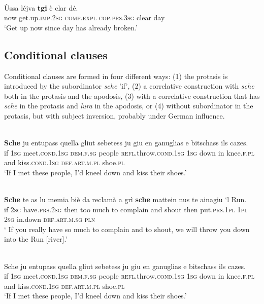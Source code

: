 \ea\label{}
\\
\gll Ùssa léjva \textbf{tgi} è clar dé.\\
  now get.up.\textsc{imp.2sg} \textsc{comp.expl} \textsc{cop.prs.3sg} clear day\\
\glt `Get up now since day has already broken.'
\z




\subsection{Conditional clauses}
Conditional clauses are formed in four different ways: (1) the protasis is introduced by the subordinator \textit{sche} 'if', (2) a correlative construction with \textit{sche} both in the protasis and the apodosis, (3) with a correlative construction that has \textit{sche} in the protasis and \textit{lura} in the apodosis, or (4) without subordinator in the protasis, but with subject inversion, probably under German influence.

\ea\label{}
\\
\gll \textbf{Sche} ju entupass quella gliut sebetess ju giu en ganuglias e bitschass ils cazes.\\
     if \textsc{1sg} meet.\textsc{cond.1sg} \textsc{dem.f.sg} people \textsc{refl}.throw.\textsc{cond.1sg} \textsc{1sg} down in knee.\textsc{f.pl} and kiss.\textsc{cond.1sg} \textsc{def.art.m.pl} shoe.\textsc{pl}\\
\glt `If I met these people, I’d kneel down and kiss their shoes.'
\z

\ea\label{}
\\
\gll \textbf{Sche} te as lu memia biè da reclamà a grì \textbf{sche} mattein nus te ainagiu ‘l Run.\\
if \textsc{2sg} have.\textsc{prs.2sg} then too much to complain and shout then put.\textsc{prs.1pl} \textsc{1pl} \textsc{2sg} in.down \textsc{def.art.m.sg} \textsc{pln}\\
     \glt ` If you really have so much to complain and to shout, we will throw you down into the Run [river].'
\z

\ea\label{}
\\
\gll Sche ju entupass quella gliut sebetess ju giu en ganuglias e bitschass ils cazes.\\
     if \textsc{1sg} meet.\textsc{cond.1sg} \textsc{dem.f.sg} people \textsc{refl}.throw.\textsc{cond.1sg} \textsc{1sg} down in knee.\textsc{f.pl} and kiss.\textsc{cond.1sg} \textsc{def.art.m.pl} shoe.\textsc{pl}\\
\glt `If I met these people, I’d kneel down and kiss their shoes.'
\z


